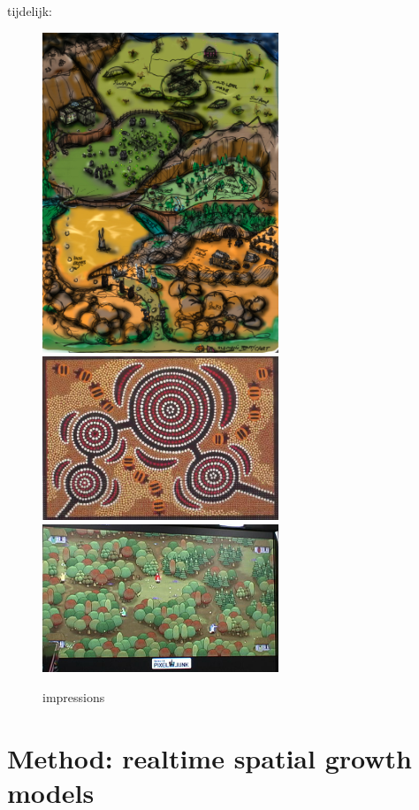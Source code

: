 \documentclass{article}
\begin{document}
tijdelijk: 

\begin{figure}
\centering
  \begin{center}
	\includegraphics[width=200pt]{images/map_design.jpg}
	\includegraphics[width=200pt]{images/aboriginal_art.jpg}
	\includegraphics[width=200pt]{images/forest.jpg}
\end{center}
	\caption{impressions}\label{fig:global_map}
\end{figure}


\section{Method: realtime spatial growth models}
\end{document}
